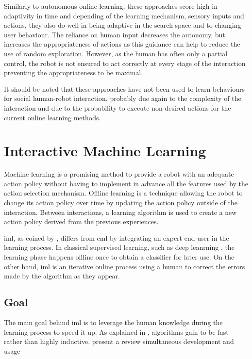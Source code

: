     Similarly to autonomous online learning, these approaches score high in
    adaptivity in time and depending of the learning mechanism, sensory inputs
    and actions, they also do well in being adaptive in the search space and to
    changing user behaviour. The reliance on human input decreases the autonomy,
    but increases the appropriateness of actions as this guidance can help to
    reduce the use of random exploration. However, as the human has often only a
    partial control, the robot is not ensured to act correctly at every stage of
    the interaction preventing the appropriateness to be maximal. 
    
    It should be noted that these approaches have not been used to learn
    behaviours for social human-robot interaction, probably due again to the
    complexity of the interaction and due to the probability to execute
    non-desired actions for the current online learning methods.

\section{Interactive Machine Learning} \label{sec:back_iml}
Machine learning is a promising method to provide a robot with an adequate action policy without having to implement in advance all the features used by the action selection mechanism. Offline learning is a technique allowing the robot to change its action policy over time by updating the action policy outside of the interaction. Between interactions, a learning algorithm is used to create a new action policy derived from the previous experiences.

\acrfull{iml}, as coined by \cite{fails2003interactive}, differs from \acrfull{cml} by integrating an expert end-user in the learning process. In classical supervised learning, such as deep leanrning \cite{lecun2015deep} , the learning phase happens offline once to obtain a classifier for later use. On the other hand, \acrshort{iml} is an iterative online process using a human to correct the errors made by the algorithm as they appear.

\subsection{Goal}

The main goal behind \gls{iml} is to leverage the human knowledge during the learning process to speed it up. As explained in \cite{fails2003interactive}, algorithms gain to be fast rather than highly inductive. \cite{amershi2014power} present a review %
simultaneous development and usage

